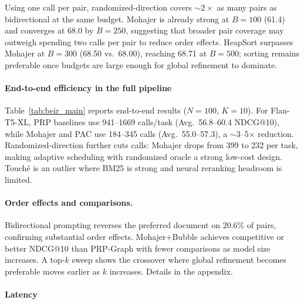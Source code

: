 \documentclass[11pt]{article}
\begin{document}
Using one call per pair, randomized-direction covers $\sim$$2\times$ as many pairs as bidirectional at the same budget.
Mohajer is already strong at $B{=}100$ (61.4) and converges at 68.0 by $B{=}250$, suggesting that broader pair coverage may outweigh spending two calls per pair to reduce order effects.
HeapSort surpasses Mohajer at $B{=}300$ (68.50 vs.\ 68.00), reaching 68.71 at $B{=}500$; sorting remains preferable once budgets are large enough for global refinement to dominate.

\vspace{-0.2cm}
\paragraph{End-to-end efficiency in the full pipeline}
\label{sec:end_to_end}

Table~\ref{tab:beir_main} reports end-to-end results ($N{=}100$, $K{=}10$). For Flan-T5-XL, PRP baselines use 941--1669 calls/task (Avg.\ 56.8--60.4 NDCG@10), while Mohajer and PAC use 184--345 calls (Avg.\ 55.0--57.3), a $\sim$3--5$\times$ reduction.
Randomized-direction further cuts calls: Mohajer drops from 399 to 232 per task, making adaptive scheduling with randomized oracle a strong low-cost design.
Touché is an outlier where BM25 is strong and neural reranking headroom is limited.

\vspace{-0.2cm}
\paragraph{Order effects and comparisons.}
Bidirectional prompting reverses the preferred document on 20.6\% of pairs, confirming substantial order effects.
Mohajer+Bubble achieves competitive or better NDCG@10 than PRP-Graph with fewer comparisons as model size increases.
A top-$k$ sweep shows the crossover where global refinement becomes preferable moves earlier as $k$ increases. Details in the appendix.




\vspace{-0.2cm}
\paragraph{Latency}
\label{sec:latency}
\end{document}
